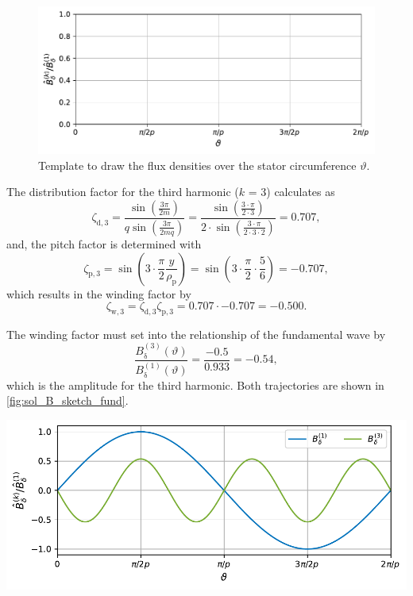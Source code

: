 \begin{figure}[ht!]
    \centering
    \includegraphics{fig/B_sketch_fund.pdf}
    \caption{Template to draw the flux densities over the stator circumference $\vartheta$.}
    \label{fig:B_sketch_fund}
\end{figure}%

\begin{solutionblock}
    The distribution factor for the third harmonic ($k$ = 3) calculates as
    $$\zeta_{\mathrm{d,}3} = \frac{\sin\left(\frac{3\pi}{2m} \right)}{q\sin\left(\frac{3\pi}{2mq} \right)}
        = \frac{\sin\left(\frac{3\cdot \pi}{2\cdot3}\right)}{2 \cdot \sin\left(\frac{3\cdot \pi}{2\cdot3\cdot 2} \right)}
        = 0.707,
    $$
    and, the pitch factor is determined with
    $$
        \zeta_{\mathrm{p,}3} = \sin\left(3 \cdot \frac{\pi}{2} \frac{y}{\rho_{\mathrm{p}}}\right)
        = \sin\left(3 \cdot \frac{\pi}{2} \cdot \frac{5}{6} \right) = -0.707,
    $$
    which results in the winding factor by
    $$ \zeta_{\mathrm{w,}3} =  \zeta_{\mathrm{d,}3}  \zeta_{\mathrm{p,}3} = 0.707 \cdot -0.707 = -0.500. $$

    The winding factor must set into the relationship of the fundamental wave by
    $$ \frac{B_{\updelta}^{(3)}(\vartheta)}{B_{\updelta}^{(1)}(\vartheta)} = \frac{-0.5}{0.933} = -0.54, $$
    which is the amplitude for the third harmonic. Both trajectories are shown in \autoref{fig:sol_B_sketch_fund}.

    \begin{solutionfigure}[ht!]
        \centering
        \includegraphics{fig/sol_B_sketch_fund.pdf}
        \caption{Solution trajectories for $B_{\updelta}^{(1)}(\vartheta)$ and $B_{\updelta}^{(3)}(\vartheta)$.}
        \label{fig:sol_B_sketch_fund}
    \end{solutionfigure}
\end{solutionblock}


